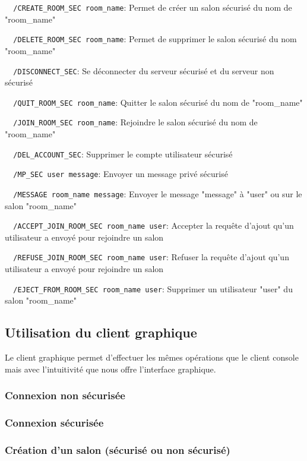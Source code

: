 \documentclass[a4paper,11pt,french]{book}
\begin{document}
\verb+	/CREATE_ROOM_SEC room_name+: Permet de créer un salon sécurisé du nom de "room\_name"

\verb+	/DELETE_ROOM_SEC room_name+: Permet de supprimer le salon sécurisé du nom "room\_name"

\verb+	/DISCONNECT_SEC+: Se déconnecter du serveur sécurisé et du serveur non sécurisé

\verb+	/QUIT_ROOM_SEC room_name+: Quitter le salon sécurisé du nom de "room\_name"

\verb+	/JOIN_ROOM_SEC room_name+: Rejoindre le salon sécurisé du nom de "room\_name"

\verb+	/DEL_ACCOUNT_SEC+: Supprimer le compte utilisateur sécurisé

\verb+	/MP_SEC user message+: Envoyer un message privé sécurisé

\verb+	/MESSAGE room_name message+: Envoyer le message "message" à "user" ou sur le salon "room\_name"

\verb+	/ACCEPT_JOIN_ROOM_SEC room_name user+: Accepter la requête d'ajout qu'un utilisateur a envoyé pour rejoindre un salon

\verb+	/REFUSE_JOIN_ROOM_SEC room_name user+: Refuser la requête d'ajout qu'un utilisateur a envoyé pour rejoindre un salon

\verb+	/EJECT_FROM_ROOM_SEC room_name user+: Supprimer un utilisateur "user" du salon "room\_name"


\subsection{Utilisation du client graphique}

Le client graphique permet d'effectuer les mêmes opérations que le client console mais avec l'intuitivité que nous offre l'interface graphique.

\subsubsection{Connexion non sécurisée}

\subsubsection{Connexion sécurisée}

\subsubsection{Création d'un salon (sécurisé ou non sécurisé)}
\end{document}
